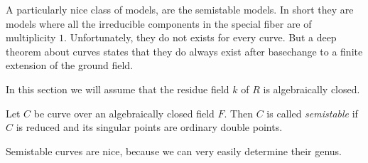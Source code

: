 A particularly nice class of models, are the semistable models.
In short they are models where all the irreducible components in the special fiber are of multiplicity $1$. 
Unfortunately, they do not exists for every curve. 
But a deep theorem about curves states that they do always exist after basechange to a finite extension of the ground field. 

In this section we will assume that the residue field $k$ of $R$ is algebraically closed. 

\begin{definition}\label{def:semi_stable_curve}
	Let $C $ be curve over an algebraically closed field $F$. 
	Then $C$ is called \emph{semistable} if $C$ is reduced and its singular points are ordinary double points. 
\end{definition}


Semistable curves are nice, because we can very easily determine their genus. 
\begin{comment}
	
\begin{lemma}
	Let $C$ be a semistable curve over an algebraically closed field $F$. 
	Let $C'$ be the normalisation of $C$ and $f: C' \to C$ the induced morphism.  
	Then there is an exact sequence \[
	0 \to f_* \omega_{C' / F} \to \omega_{C / F} \to \mathcal{F}  \to 0
	.\] 
	where $\mathcal{F} $ is the skyscraper sheaf which vanishes in the smooth locus of $C$ and for $x$ in the singular locus of $C$ we have $\mathcal{F} _x  = F$. 
\end{lemma}
\todo{Do we need this lemma???}
\begin{proof}
	Intuitively, $C'$ is the disjoint union of the normalisations of the irreducible components of $C$. 
	So $C'$ consists of the same irreducible components, but they are no longer connected along the intersection points. 
	So along the smooth locus of $C$, the map $f_* \omega_{C' / F} \to \omega_{C / F}$ is an isomorphism, and thus $\mathcal{F} $ vanishes on the smooth locus of $C$. 

	Lets now consider a singular point $x$ on $C$. 
	Then $f^{-1}(x)$ are two smooth points.
	Hence the morphism on residue fields $(f_* \omega_{C' / F})_x \to (\omega_{C  /F})_x$ is $F \to F^2$ and thus $\mathcal{F} _x \simeq F$ \todo{this does not make sense?}
	
	For a more detailed argument see \cite[lem.\ 10.3.12]{liuAlgebraicGeometryArithmetic2002}. 
\end{proof}
\end{comment}

